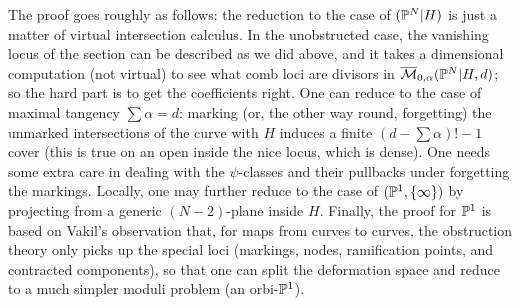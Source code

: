 The proof goes roughly as follows: the reduction to the case of $(\mathbb P^N|H)$ is just a matter of virtual intersection calculus. In the unobstructed case, the vanishing locus of the section can be described as we did above, and it takes a dimensional computation (not virtual) to see what comb loci are divisors in $\overline{\mathcal{M}}_{0,\alpha}(\mathbb P^N|H,d)$; so the hard part is to get the coefficients right. One can reduce to the case of maximal tangency $\sum\alpha=d$: marking (or, the other way round, forgetting) the unmarked intersections of the curve with $H$ induces a finite $(d-\sum\alpha)!-1$ cover (this is true on an open inside the nice locus, which is dense). One needs some extra care in dealing with the $\psi$-classes and their pullbacks under forgetting the markings. Locally, one may further reduce to the case of $(\mathbb P^1,\{\infty\})$ by projecting from a generic $(N-2)$-plane inside $H$. Finally, the proof for $\mathbb P^1$ is based on Vakil's observation that, for maps from curves to curves, the obstruction theory only picks up the special loci (markings, nodes, ramification points, and contracted components), so that one can split the deformation space and reduce to a much simpler moduli problem (an orbi-$\mathbb P^1$).
